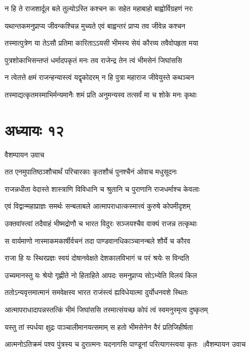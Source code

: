 \twolineshloka
{न हि ते राजशार्दूल बले तुल्योऽस्ति कश्चन}
{कः सहेत महाबाहो बाह्वोर्विग्रहणं नरः}


\twolineshloka
{यथान्तकमनुप्राप्य जीवन्कश्चिन्न मुच्यते}
{एवं बाह्वन्तरं प्राप्य तव जीवेन्न कश्चन}


\twolineshloka
{तस्मात्पुत्रेण या तेऽसौ प्रतिमा कारिताऽऽयसी}
{भीमस्य सेयं कौरव्य तवैवोपहृता मया}


\twolineshloka
{पुत्रशोकाभिसन्तप्तं धर्मादपकृतं मनः}
{तव राजेन्द्र तेन त्वं भीमसेनं जिघांससि}


\twolineshloka
{न त्वेतत्ते क्षमं राजन्हन्यास्त्वं यद्वृकोदरम्}
{न हि पुत्रा महाराज जीवेयुस्ते कथञ्चन}


\twolineshloka
{तस्माद्यत्कृतमस्माभिर्मन्यमानैः शमं प्रति}
{अनुमन्यस्व तत्सर्वं मा च शोके मनः कृथाः}


\chapter{अध्यायः १२}
\twolineshloka
{वैशम्पायन उवाच}
{}


\twolineshloka
{तत एनमुपातिष्ठञ्शौचार्थं परिचारकाः}
{कृतशौचं पुनश्चैनं ओवाच मधुसूदनः}


\twolineshloka
{राजन्नधीता वेदास्ते शास्त्राणि विविधानि च}
{श्रुतानि च पुराणानि राजधर्माश्च केवलाः}


\twolineshloka
{एवं विद्वान्महाप्राज्ञः समर्थः सन्बलाबले}
{आत्मापराधात्कस्मात्त्वं कुरुषे कोपमीदृशम्}


\twolineshloka
{उक्तवांस्त्वां तदैवाहं भीष्मद्रोणौ च भारत}
{विदुरः सञ्जयश्चैव वाक्यं राजन्न तत्कृथाः}


\twolineshloka
{स वार्यमाणो नास्माकमकार्षीर्वचनं तदा}
{पाण्डवानधिकाञ्चानन्बले शौर्ये च कौरव}


\twolineshloka
{राजा हि यः स्थिरप्रज्ञः स्वयं दोषानवेक्षते}
{देशकालविभागं च परं श्रयेः स विन्दति}


\twolineshloka
{उच्यमानस्तु यः श्रेयो गृह्णीते नो हिताहिते}
{आपदः समनुप्राप्य सोऽभ्येति विलयं किल}


\twolineshloka
{ततोऽन्यवृत्तमात्मानं समवेक्षस्व भारत}
{राजंस्त्वं ह्यविधेयात्मा दुर्योधनवशे स्थितः}


\twolineshloka
{आत्मापराधादापन्नस्तत्किं भीमं जिघांससि}
{तस्मात्संयच्छ कोपं त्वं स्वमनुस्मृत्य दुष्कृतम्}


\twolineshloka
{यस्तु तां स्पर्धया क्षुद्रः पाञ्चालीमानयत्समाम्}
{स हतो भीमसेनेन वैरं प्रतिजिहीर्षता}


\threelineshloka
{आत्मनोऽतिक्रमं पश्य पुंत्रस्य च दुरात्मनः}
{यदनागसि पाण्डूनां परित्यागस्त्वया कृतः ॥वैशम्पायन उवाच}
{}


